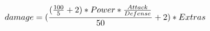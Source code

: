 \documentclass[preview]{standalone}
\begin{document}
\begin{align*}
\special{dvisvgm:raw <g id='unique000'>}damage = (\frac{(\frac{100}{5} + 2) * Power * \frac{Attack}{Defense}}{50} + 2) * Extras\special{dvisvgm:raw </g>}
\end{align*}
\end{document}
